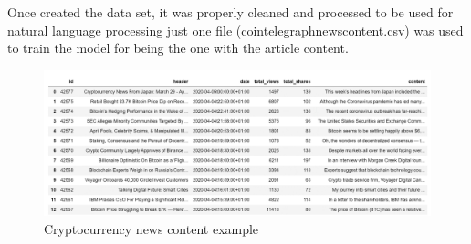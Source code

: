 Once created the data set, it was properly cleaned and processed to be used for natural language processing just one file (cointelegraph\textunderscore news\textunderscore content.csv) was used to train the model for being the one with the article content.

\begin{figure}[H]
   \centering
   \includegraphics[width=\linewidth]{fig/NewsContentExample.png}
    \caption{Cryptocurrency news content example}
    \label{fig:NewsContentExample}
\end{figure}
